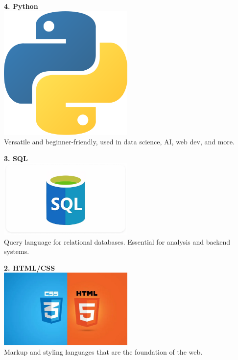 \documentclass[12pt,a4paper]{article}
\begin{document}
\hrulefill

\textbf{4. Python} \\
\includegraphics[width=0.5\textwidth]{images/py.png} \\
Versatile and beginner-friendly, used in data science, AI, web dev, and more.

\hrulefill

\textbf{3. SQL} \\
\includegraphics[width=0.5\textwidth]{images/sql.png} \\
Query language for relational databases. Essential for analysis and backend systems.

\hrulefill

\textbf{2. HTML/CSS} \\
\includegraphics[width=0.5\textwidth]{images/htmlcss.png} \\
Markup and styling languages that are the foundation of the web.

\hrulefill
\end{document}
